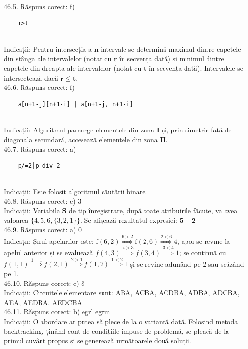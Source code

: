 46.5. Răspuns corect: f) \begin{verbatim}
    r>t
\end{verbatim}\\
Indicații: Pentru intersecția a $\mathbf{n}$ intervale se determină maximul dintre capetele din stânga ale intervalelor (notat cu $\mathbf{r}$ în secvența dată) și minimul dintre capetele din dreapta ale intervalelor (notat cu $\mathbf{t}$ în secvența dată). Intervalele se intersectează dacă $\mathbf{r \leq t}$.\\

46.6. Răspuns corect: f) \begin{verbatim}
    a[n+1-j][n+1-i] | a[n+1-j, n+1-i]
\end{verbatim}\\
Indicații: Algoritmul parcurge elementele din zona $\mathbf{I}$ și, prin simetrie față de diagonala secundară, accesează elementele din zona $\mathbf{II}$.\\

46.7. Răspuns corect: a) \begin{verbatim}
    p/=2│p div 2 
\end{verbatim}\\
Indicații: Este folosit algoritmul căutării binare.\\

46.8. Răspuns corect: c) 3\\
Indicații: Variabila $\mathbf{S}$ de tip înregistrare, după toate atribuirile făcute, va avea valoarea $\{4,5,6,\{3,2,1\}\}$. Se afișează rezultatul expresiei: $\mathbf{5-2}$\\

46.9. Răspuns corect: a) 0\\
Indicații: Șirul apelurilor este: $\mathrm{f}(6,2) \stackrel{6>2}{\Longrightarrow} \mathrm{f}(2,6) \stackrel{2<6}{\Longrightarrow} 4$, apoi se revine la apelul anterior și se evaluează $f(4,3) \stackrel{4>3}{\Longrightarrow} f(3,4) \stackrel{3<4}{\Longrightarrow} 1$; se continuă cu $f(1,1) \stackrel{1=1}{\Longrightarrow} f(2,1) \stackrel{2>1}{\Longrightarrow} f(1,2) \stackrel{1<2}{\Rightarrow} 1$ și se revine adunând pe 2 sau scăzând pe 1.\\

46.10. Răspuns corect: e) 8\\
Indicații: Circuitele elementare sunt: ABA, ACBA, ACDBA, ADBA, ADCBA, AEA, AEDBA, AEDCBA\\

46.11. Răspuns corect: b) egrl egrm\\
Indicații: O abordare ar putea să plece de la o variantă dată. Folosind metoda backtracking, ținând cont de condițiile impuse de problemă, se pleacă de la primul cuvânt propus și se generează următoarele două soluții.\\

